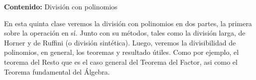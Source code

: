 {\Large\textbf{Contenido:} División con polinomios}

En esta quinta clase veremos la división con polinomios en dos partes, la primera sobre la operación en sí.
Junto con su métodos, tales como la división larga, de Horner y de Ruffini (o división sintética).
Luego, veremos la divisibilidad de polinomios, en general, los teoremas y resultado útiles.
Como por ejemplo, el teorema del Resto que es el caso general del Teorema del Factor, asi como el Teorema fundamental del Álgebra.
